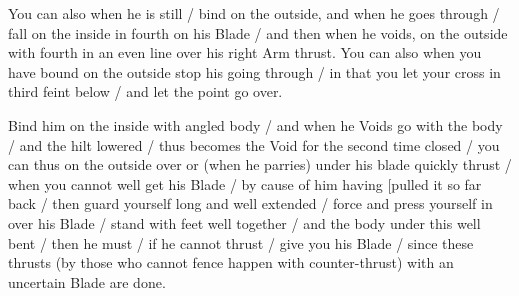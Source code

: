 \newpage


\newpage



You can also when he is still / bind on the outside, and when he goes
through / fall on the inside in fourth on his Blade / and then when he
voids, on the outside with fourth in an even line over his right Arm
thrust. You can also when you have bound on the outside stop his going
through / in that you let your cross in third feint below / and
let the point go over.


Bind him on the inside with angled body / and when he Voids go with
the body / and the hilt lowered / thus becomes the Void for the second
time closed / you can thus on the outside over or (when he parries)
under his blade quickly thrust / when you cannot well get his Blade /
by cause of him having [pulled it so far back / then guard yourself
long and well extended / force and press yourself in over his Blade /
stand with feet well together / and the body under this well bent /
then he must / if he cannot thrust / give you his Blade / since these
thrusts (by those who cannot fence happen with
counter-thrust) with an uncertain Blade are
done.

